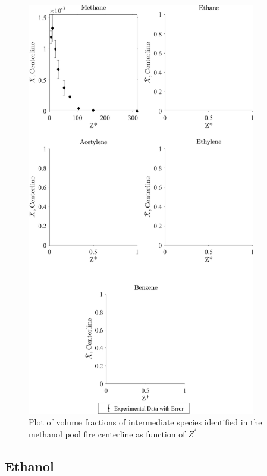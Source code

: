 \documentclass[12pt]{article}
\begin{document}
\begin{figure}[!h]
	\centering
\includegraphics[width=10.0cm,keepaspectratio]{Methanol_Inter_MOL_FRAC_Plot.png}
	\caption[Plot of volume fractions, with error, of intermediate species identified in the methanol pool fire centerline as function of $Z^{*}$]{Plot of volume fractions of intermediate species identified in the methanol pool fire centerline as function of $Z^{*}$}
	\label{fig:Methanol_VOL_Frac_Inter}
\end{figure}
\pagebreak

\subsection{Ethanol}
\label{ssec:Ethanol_ALL_Vol_Frac}
\end{document}
